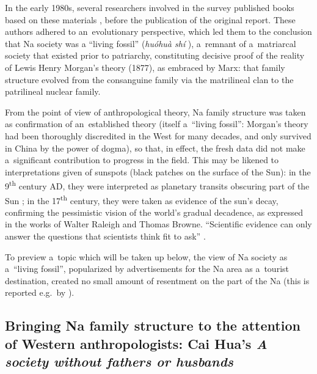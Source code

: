 In the early 1980s, several researchers involved in the survey published books based on these
materials \citep{zhanetal1980,yanetal1984}, before the publication of the original report. These
authors adhered to an~evolutionary perspective, which led them to the conclusion that Na society was
a “living fossil” 
(\textit{huóhuà shí} ), a~remnant of a~matriarcal society that existed
prior to patriarchy, constituting decisive proof of the reality of Lewis Henry Morgan’s theory
(1877), as embraced by Marx: that family structure evolved from the consanguine family via the
matrilineal clan to the patrilineal nuclear family. 

From the point of view of anthropological theory, Na family structure was taken as confirmation of an~established theory (itself a~“living fossil”: Morgan's theory had been thoroughly discredited in the West for many decades, and only survived in China by the power of dogma), so that, in effect, the fresh data did not make a~significant contribution to
progress in the field. This may be likened to interpretations given of sunspots (black patches on
the surface of the Sun): in the 9\textsuperscript{th} century AD, they were interpreted as planetary transits
obscuring part of the Sun \citep[93]{Wilson1917}; in the 17\textsuperscript{th} century, they were taken as evidence
of the sun’s decay, confirming the pessimistic vision of the world’s gradual decadence, as expressed in the works of Walter Raleigh and Thomas Browne. “Scientific evidence can only answer the questions
that scientists think fit to ask” \citep[21]{Hampson1968}.

To preview a~topic which will be taken up below, the view of Na society as a~“living fossil”,
popularized by advertisements for the Na area as a~tourist destination, created no small amount of
resentment on the part of the Na (this is reported e.g.~by \citealt[132]{shih2010}).


\subsection[Cai Hua’s \textit{A society without fathers or husbands}]{Bringing Na family structure to the attention of Western anthropologists: Cai Hua’s \textit{A society without fathers or husbands}}
\label{sec:bringingnafamilystructuretotheattentionofwesternanthropologistscaihuas19972001asocietywithoutfathersorhusbands}
\nocite{cai1997,cai2001}

